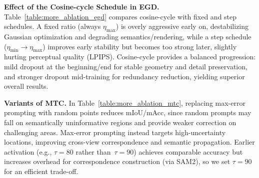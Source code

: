 \documentclass[runningheads]{llncs}
\begin{document}
\noindent
\textbf{Effect of the Cosine-cycle Schedule in EGD.}
Table~\ref{table:more_ablation_egd} compares cosine-cycle with fixed and step schedules.
A fixed ratio (always $\eta_{\max}$) is overly aggressive early on, destabilizing Gaussian optimization and degrading semantics/rendering, while a step schedule ($\eta_{\min}\!\rightarrow\!\eta_{\max}$) improves early stability but becomes too strong later, slightly hurting perceptual quality (LPIPS).
Cosine-cycle provides a balanced progression: mild dropout at the beginning/end for stable geometry and detail preservation, and stronger dropout mid-training for redundancy reduction, yielding superior overall results.


\noindent
\textbf{Variants of MTC.}
In Table~\ref{table:more_ablation_mtc}, replacing max-error prompting with random points reduces mIoU/mAcc, since random prompts may fall on semantically uninformative regions and provide weaker correction on challenging areas. Max-error prompting instead targets high-uncertainty locations, improving cross-view correspondence and semantic propagation. 
Earlier activation (e.g., $\tau=80$ rather than\ $\tau=90$) achieves comparable accuracy but increases overhead for correspondence construction (via SAM2), so we set $\tau=90$ for an efficient trade-off.
\end{document}
